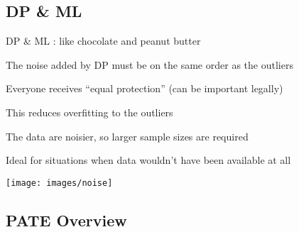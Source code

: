 \documentclass[xor=table]{beamer}
\let\svpar\par
\let\svitemize\itemize
\let\svenditemize\enditemize
\let\svitem\item
\let\svcenter\center
\let\svendcenter\endcenter
\let\svcolumn\column
\let\svendcolumn\endcolumn
\newcommand\stretchoff{%
  \let\par\svpar%
  \let\item\svitem%
  \let\itemize\svitemize%
  \let\enditemize\svenditemize%
  \let\center\svcenter%
  \let\endcenter\svendcenter%
  \let\column\svcolumn%
  \let\endcolumn\svendcolumn%
}
\begin{document}
\subsection*{DP & ML}
\stretchoff
\begin{frame}{DP \& ML : like chocolate and peanut butter}
\begin{multicols}{2}

\begin{itemize}
	\item[$\bullet$] The noise added by DP must be on the same order as the outliers
		\begin{itemize}
		\item[$\bullet$] Everyone receives ``equal protection'' (can be important legally)
		
		
		\item[$\bullet$] This reduces overfitting to the outliers 
		\end{itemize}

	

	\item The data are noisier, so larger sample sizes are required	
	\item[$\bullet$] Ideal for situations when data wouldn't have been available at all

\end{itemize}



\columnbreak
	\begin{center}
	\texttt{[image: images/noise]}
	\end{center}
\end{multicols}
\end{frame}




\subsection*{PATE Overview}
\stretchoff
\end{document}
